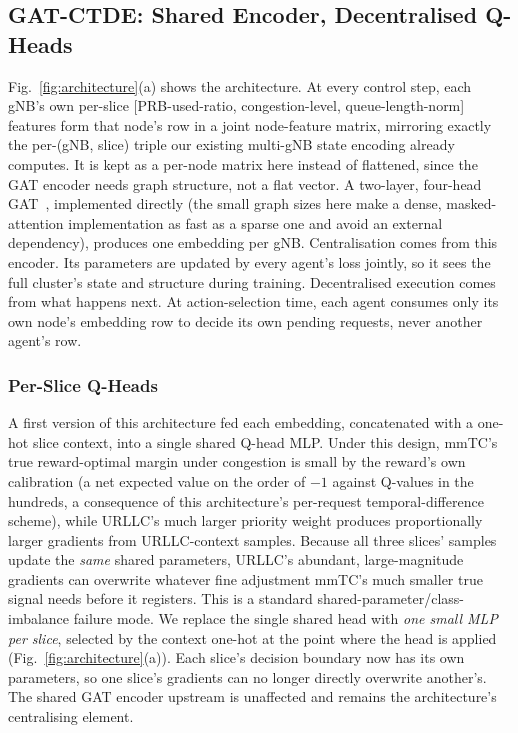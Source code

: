 \documentclass[journal]{IEEEtran}
\begin{document}
\subsection{GAT-CTDE: Shared Encoder, Decentralised Q-Heads}
Fig.~\ref{fig:architecture}(a) shows the architecture. At every
control step, each gNB's own per-slice
[PRB-used-ratio, congestion-level, queue-length-norm] features form
that node's row in a joint node-feature matrix, mirroring exactly the
per-(gNB, slice) triple our existing multi-gNB state encoding already
computes. It is kept as a per-node matrix here instead of flattened, since
the GAT encoder needs graph structure, not a flat vector. A two-layer,
four-head GAT~\cite{gat}, implemented directly (the small graph sizes
here make a dense, masked-attention implementation as fast as a sparse
one and avoid an external dependency), produces one embedding per gNB.
Centralisation comes from this encoder. Its parameters are updated by
every agent's loss jointly, so it sees the full cluster's state and
structure during training. Decentralised execution comes from what
happens next. At action-selection time, each agent consumes only its
own node's embedding row to decide its own pending requests,
never another agent's row.

\subsubsection{Per-Slice Q-Heads}
\label{sec:methodology-perslice}
A first version of this architecture fed each embedding, concatenated
with a one-hot slice context, into a single shared Q-head MLP. Under
this design, mmTC's true reward-optimal margin under congestion is
small by the reward's own calibration (a net expected value on the
order of $-1$ against Q-values in the hundreds, a consequence of this
architecture's per-request temporal-difference scheme), while URLLC's
much larger priority weight produces proportionally larger gradients
from URLLC-context samples. Because all three slices' samples update
the \emph{same} shared parameters, URLLC's abundant, large-magnitude
gradients can overwrite whatever fine adjustment mmTC's much smaller
true signal needs before it registers. This is a standard
shared-parameter/class-imbalance failure mode. We replace the single
shared head with \emph{one small MLP per slice}, selected by the
context one-hot at the point where the head is applied
(Fig.~\ref{fig:architecture}(a)). Each slice's decision boundary now
has its own parameters, so one slice's gradients can no longer
directly overwrite another's. The shared GAT encoder upstream is
unaffected and remains the architecture's centralising element.
\end{document}
